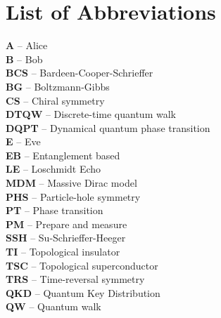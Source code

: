 \chapter*{List of Abbreviations}

\textbf{A} -- Alice
\vspace{0.5cm}\\
\textbf{B} -- Bob
\vspace{0.5cm}\\
\textbf{BCS} -- Bardeen-Cooper-Schrieffer
\vspace{0.5cm}\\
\textbf{BG} -- Boltzmann-Gibbs
\vspace{0.5cm}\\
\textbf{CS} -- Chiral symmetry
\vspace{0.5cm}\\
\textbf{DTQW} -- Discrete-time quantum walk 
\vspace{0.5cm}\\
\textbf{DQPT} -- Dynamical quantum phase transition 
\vspace{0.5cm}\\
\textbf{E} -- Eve
\vspace{0.5cm}\\
\textbf{EB} -- Entanglement based
\vspace{0.5cm}\\
\textbf{LE} -- Loschmidt Echo
\vspace{0.5cm}\\
\textbf{MDM} -- Massive Dirac model
\vspace{0.5cm}\\
\textbf{PHS} -- Particle-hole symmetry
\vspace{0.5cm}\\
\textbf{PT} -- Phase transition
\vspace{0.5cm}\\
\textbf{PM} -- Prepare and measure
\vspace{0.5cm}\\
\textbf{SSH} -- Su-Schrieffer-Heeger
\vspace{0.5cm}\\
\textbf{TI} -- Topological insulator
\vspace{0.5cm}\\
\textbf{TSC} -- Topological superconductor
\vspace{0.5cm}\\
\textbf{TRS} -- Time-reversal symmetry
\vspace{0.5cm}\\
\textbf{QKD} -- Quantum Key Distribution
\vspace{0.5cm}\\
\textbf{QW} -- Quantum walk
\vspace{0.5cm}\\
